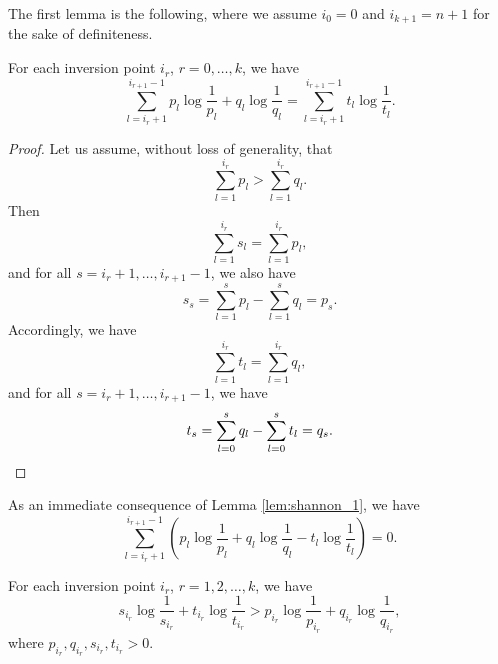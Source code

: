 The first lemma is the following, where we assume $i_0 = 0$ and $i_{k+1} = n + 1$ for the sake of definiteness.

\begin{appendix_lemma} \label{lem:shannon_1}
    For each inversion point $i_r$, $r = 0, \ldots, k$, we have
    \begin{equation}
        \sum_{l=i_r+1}^{i_{r+1}-1} p_l \log \frac{1}{p_l} + q_l \log \frac{1}{q_l} = \sum_{l=i_r+1}^{i_{r+1}-1} t_l \log \frac{1}{t_l}.
    \end{equation}
\end{appendix_lemma} 

\begin{proof} Let us assume, without loss of generality, that
    \begin{equation}
        \sum_{l=1}^{i_r} p_l > \sum_{l=1}^{i_r} q_l.
    \end{equation}
    Then
    \begin{equation}
        \sum_{l=1}^{i_r} s_l = \sum_{l=1}^{i_r} p_l,
    \end{equation}
    and for all $s = i_r + 1, \ldots, i_{r+1} - 1$, we also have
    \begin{equation}
        s_s = \sum_{l=1}^{s} p_l - \sum_{l=1}^{s} q_l = p_s.
    \end{equation}
    Accordingly, we have
    \begin{equation}
        \sum_{l=1}^{i_r} t_l = \sum_{l=1}^{i_r} q_l,
    \end{equation}
    and for all $s = i_r + 1, \ldots, i_{r+1} - 1$, we have
    \begin{equation}
        t_s = \sum_{l=0}^{s} q_l - \sum_{l=0}^{s} t_l = q_s. \qedhere
    \end{equation}
\end{proof}

As an immediate consequence of Lemma \ref{lem:shannon_1}, we have
\begin{equation}
    \sum_{l=i_r+1}^{i_{r+1}-1} \left( p_l \log \frac{1}{p_l} + q_l \log \frac{1}{q_l} - t_l \log \frac{1}{t_l} \right) = 0.
\end{equation}

\begin{appendix_lemma} \label{lem:shannon_2}
    For each inversion point $i_r$, $r = 1, 2, \ldots, k$, we have
    \begin{equation}
        s_{i_r} \log \frac{1}{s_{i_r}} + t_{i_r} \log \frac{1}{t_{i_r}} > p_{i_r} \log \frac{1}{p_{i_r}} + q_{i_r} \log \frac{1}{q_{i_r}},
    \end{equation}
    where $p_{i_r}, q_{i_r}, s_{i_r}, t_{i_r} > 0$.
\end{appendix_lemma}

